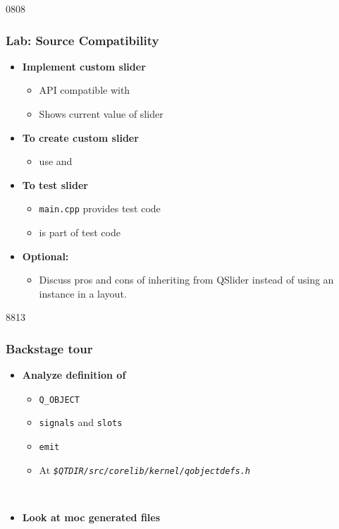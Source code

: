 \begin{slide}{0808}
\frametitle{Lab: Source Compatibility}
\label{project_slider_with_indicator}
 \begin{itemize}
  \item \textbf{Implement custom slider}
    \begin{itemize}
    \item API compatible with 
    \item Shows current value of slider
    \end{itemize}
 \item \textbf{To create custom slider}
    \begin{itemize}
    \item use  and 
    \end{itemize}
  \item \textbf{To test slider}
    \begin{itemize}
    \item \texttt{main.cpp} provides test code
    \item {} is part of test code
    \end{itemize}
  \item \textbf{Optional:}
    \begin{itemize}
    \item  Discuss pros and cons of inheriting from
      QSlider instead of using an instance in a layout.
    \end{itemize}
  \end{itemize}
  \vfill
  
\end{slide}

\begin{slide}{8813}\frametitle{Backstage tour}
  \begin{itemize}
  \item \textbf{Analyze definition of}
  \begin{itemize}
  \item \texttt{Q\_OBJECT}
  \item \texttt{signals} and \texttt{slots}
  \item \texttt{emit}
  \item At \textit{\texttt{\$QTDIR/src/corelib/kernel/qobjectdefs.h}}
  \end{itemize}\strut\\
\item \textbf{Look at moc generated files}
  \end{itemize}
\end{slide}
